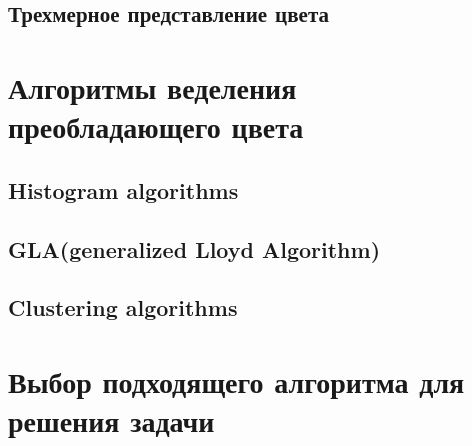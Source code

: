 \subsection{ Трехмерное представление цвета}

\section{ Алгоритмы веделения преобладающего цвета}
\subsection{ Histogram algorithms}
\subsection{ GLA(generalized Lloyd Algorithm)}
\subsection{ Clustering algorithms}

\section{ Выбор подходящего алгоритма для решения задачи}

